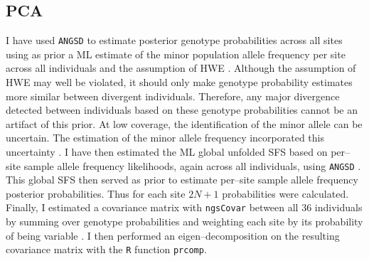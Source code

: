\documentclass[a4paper,12pt,times,print,index,custombib,custommargin]{PhDThesisPSnPDF}\usepackage[]{graphicx}\usepackage[]{color}
\begin{document}
\subsection{PCA}
%
%
I have used \texttt{ANGSD}  \citep{Korneliussen2014} to estimate posterior genotype probabilities across all sites using as prior a \gls{ML} estimate of the minor \gls{population allele frequency} per site across all individuals and the assumption of \gls{HWE} \citep{Kim2011}. Although the assumption of \gls{HWE} may well be violated, it should only make genotype probability estimates more similar between divergent individuals. Therefore, any major divergence detected between individuals based on these genotype probabilities cannot be an artifact of this prior. At low coverage, the identification of the minor allele can be uncertain. The estimation of the minor allele frequency incorporated this uncertainty \cite[suppl. mat.]{Skotte2012}. I have then estimated the \gls{ML} global unfolded \gls{SFS} based on per--site \gls{sample allele frequency} likelihoods, again across all individuals, using \texttt{ANGSD} \citep{Nielsen2012, Korneliussen2013}. This global \gls{SFS} then served as prior to estimate per--site \gls{sample allele frequency} posterior probabilities. Thus for each site $2N+1$ probabilities were calculated. Finally, I estimated a covariance matrix with \texttt{ngsCovar} \citep{Fumagalli2014} between all 36 individuals by summing over genotype probabilities and weighting each site by its probability of being variable \citep[eq. 19 and 20]{Fumagalli2013}. I then performed an eigen--decomposition on the resulting covariance matrix with the \texttt{R} function \texttt{prcomp}.
%
%
\end{document}
